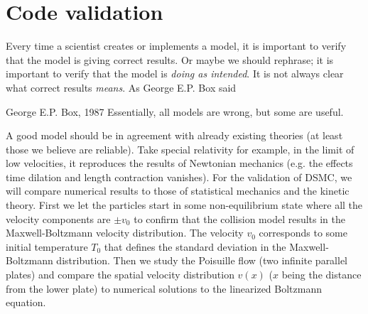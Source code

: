 \section{Code validation}
\label{sec:dsmc_code_validation}
Every time a scientist creates or implements a model, it is important to verify that the model is giving correct results. Or maybe we should rephrase; it is important to verify that the model is \textit{doing as intended}. It is not always clear what correct results \textit{means}. As George E.P. Box said
\begin{aquote}{George E.P. Box, 1987}
Essentially, all models are wrong, but some are useful.
\end{aquote}
A good model should be in agreement with already existing theories (at least those we believe are reliable). Take special relativity for example, in the limit of low velocities, it reproduces the results of Newtonian mechanics (e.g. the effects time dilation and length contraction vanishes). For the validation of DSMC, we will compare numerical results to those of statistical mechanics and the kinetic theory. First we let the particles start in some non-equilibrium state where all the velocity components are $\pm v_0$ to confirm that the collision model results in the Maxwell-Boltzmann velocity distribution. The velocity $v_0$ corresponds to some initial temperature $T_0$ that defines the standard deviation in the Maxwell-Boltzmann distribution. Then we study the Poisuille flow (two infinite parallel plates) and compare the spatial velocity distribution $v(x)$ ($x$ being the distance from the lower plate) to numerical solutions to the linearized Boltzmann equation.
